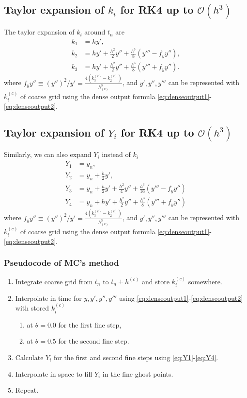\documentclass[prd,aps,a4paper,superscriptaddress,onecolumn,footinbib]{revtex4}
\begin{document}
\subsection{Taylor expansion of $k_i$ for RK4 up to $\mathcal{O}(h^3)$}

The taylor expansion of $k_i$ around $t_n$ are
\begin{align}
    k_1&=hy', \\
    k_2&=hy'+\frac{h^2}{2}y''+\frac{h^3}{8}(y'''-f_yy''), \\
    k_3&=hy'+\frac{h^2}{2}y''+\frac{h^3}{8}(y'''+f_yy'').
\end{align}
where
$f_yy''\equiv\left(y''\right)^2/y'=\frac{4(k^{(c)}_3-k^{(c)}_2)}{h^3_{(c)}}$,
and $y',y'',y'''$ can be represented with $k^{(c)}_i$ of coarse grid using the dense output formula \eqref{eq:denseoutput1}-\eqref{eq:denseoutput2}.

\subsection{Taylor expansion of $Y_i$ for RK4 up to $\mathcal{O}(h^3)$}

Similarly, we can also expand $Y_i$ instead of $k_i$
\begin{align}
    Y_1&=y_n, \label{eq:Y1} \\
    Y_2&=y_n + \frac{h}{2}y', \label{eq:Y2} \\
    Y_3&=y_n + \frac{h}{2}y' + \frac{h^2}{4}y''+\frac{h^3}{16}(y'''-f_yy'') \label{eq:Y3} \\
    Y_4&=y_n + hy' + \frac{h^2}{2}y''+\frac{h^3}{8}(y'''+f_yy'') \label{eq:Y4}
\end{align}
where $f_yy''\equiv\left(y''\right)^2/y'=\frac{4(k^{(c)}_3-k^{(c)}_2)}{h^3_{(c)}}$,
and $y',y'',y'''$ can be represented with $k^{(c)}_i$ of coarse grid using the dense output formula \eqref{eq:denseoutput1}-\eqref{eq:denseoutput2}.

\subsubsection{Pseudocode of MC's method}
\begin{enumerate}
    \item Integrate coarse grid from $t_n$ to $t_n+h^{(c)}$ and store $k^{(c)}_i$
        somewhere.
    \item Interpolate in time for $y,y',y'',y'''$ using
        \eqref{eq:denseoutput1}-\eqref{eq:denseoutput2} with stored $k_i^{(c)}$
        \begin{enumerate}[label=(\alph*)]
            \item at $\theta=0.0$ for the first fine step,
            \item at $\theta=0.5$ for the second fine step.
        \end{enumerate}
    \item Calculate $Y_i$ for the first and second fine steps using \eqref{eq:Y1}-\eqref{eq:Y4}.
    \item Interpolate in space to fill $Y_i$ in the fine ghost points.
    \item Repeat.
\end{enumerate}



%
%
\end{document}
